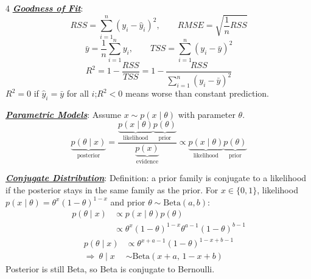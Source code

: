 \documentclass[12pt]{article}
\newcommand{\bulletPoint}[1]{\ul{\textit{\textbf{#1}}}}
\begin{document}
\begin{multicols*}{4}
\bulletPoint{Goodness of Fit}:
\useshortskip \begin{equation*}
    RSS=\sum_{i=1}^{n}(y_i-\hat{y}_i)^2,\qquad
    RMSE=\sqrt{\frac{1}{n}RSS}
\end{equation*}
\useshortskip \begin{equation*}
    \bar{y}=\frac{1}{n}\sum_{i=1}^{n}y_i,\qquad
    TSS=\sum_{i=1}^{n}(y_i-\bar{y})^2
\end{equation*}
\useshortskip \begin{equation*}
    R^2=1-\frac{RSS}{TSS}
    =1-\frac{RSS}{\sum_{i=1}^{n}(y_i-\bar{y})^2}
\end{equation*}
$R^2=0$ if $\hat{y}_i=\bar{y}$ for all $i$;\quad $R^2<0$ means worse than constant prediction.

\bulletPoint{Parametric Models}:
Assume $x\sim p(x\mid \theta)$ with parameter $\theta$.
\useshortskip \begin{equation*}
    \underbrace{p(\theta\mid x)}_{\text{posterior}}
    =\frac{\underbrace{p(x\mid\theta)}_{\text{likelihood}}
    \underbrace{p(\theta)}_{\text{prior}}}
    {\underbrace{p(x)}_{\text{evidence}}}
    \propto \underbrace{p(x\mid\theta)}_{\text{likelihood}}
    \underbrace{p(\theta)}_{\text{prior}}
\end{equation*}


\bulletPoint{Conjugate Distribution}:
Definition: a prior family is conjugate to a likelihood if the posterior stays in the same family as the prior.
For $x\in\{0,1\}$, likelihood $p(x\mid\theta)=\theta^x(1-\theta)^{1-x}$ and prior $\theta\sim\mathrm{Beta}(a,b)$:
\useshortskip \begin{equation*}
    \begin{split}
        p(\theta\mid x) &\propto p(x\mid\theta)p(\theta) \\
        &\propto \theta^x(1-\theta)^{1-x}\theta^{a-1}(1-\theta)^{b-1}
    \end{split}
\end{equation*}
\useshortskip \begin{equation*}
    \begin{split}
        p(\theta\mid x) &\propto \theta^{x+a-1}(1-\theta)^{1-x+b-1} \\
        \Rightarrow\ \theta\mid x &\sim \mathrm{Beta}(x+a,\,1-x+b)
    \end{split}
\end{equation*}
Posterior is still Beta, so Beta is conjugate to Bernoulli.


\end{multicols*}
\end{document}

